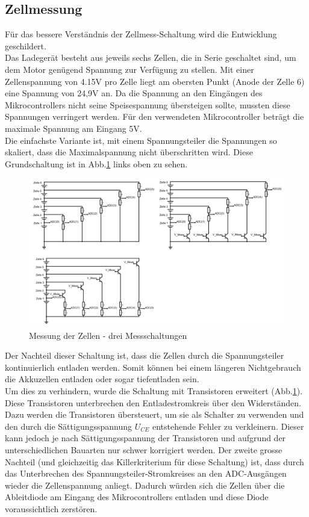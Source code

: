 \subsection*{Zellmessung}
Für das bessere Verständnis der Zellmess-Schaltung wird die Entwicklung geschildert. \\
Das Ladegerät besteht aus jeweils sechs Zellen, die in Serie geschaltet sind, um dem Motor genügend Spannung zur Verfügung zu stellen. Mit einer Zellenspannung von 4.15V pro Zelle liegt am obersten Punkt (Anode der Zelle 6) eine Spannung von 24,9V an. Da die Spannung an den Eingängen des Mikrocontrollers nicht seine Speisespannung übersteigen sollte, mussten diese Spannungen verringert werden. Für den verwendeten Mikrocontroller beträgt die maximale Spannung am Eingang 5V.
\\
Die einfachste Variante ist, mit einem Spannungsteiler die Spannungen so skaliert, dass die Maximalspannung nicht überschritten wird. Diese Grundschaltung ist in Abb.\ref{fig:zellmessung} links oben zu sehen. 
\begin{figure} [H]
	\centering
	\includegraphics[width=1\linewidth]{images/Zellmessung}
	\caption{Messung der Zellen - drei Messschaltungen}
	\label{fig:zellmessung}
\end{figure}
Der Nachteil dieser Schaltung ist, dass die Zellen durch die Spannungsteiler kontinuierlich entladen werden. Somit können bei einem längeren Nichtgebrauch die Akkuzellen entladen oder sogar tiefentladen sein. \\
Um dies zu verhindern, wurde die Schaltung mit Transistoren erweitert (Abb.\ref{fig:zellmessung}). Diese Transistoren unterbrechen den Entladestromkreis über den Widerständen. Dazu werden die Transistoren übersteuert, um sie als Schalter zu verwenden und den durch die Sättigungsspannung $U_{CE}$ entstehende Fehler zu verkleinern. Dieser kann jedoch je nach Sättigungsspannung der Transistoren und aufgrund der unterschiedlichen Bauarten nur schwer korrigiert werden. Der zweite grosse Nachteil (und gleichzeitig das Killerkriterium für diese Schaltung) ist, dass durch das Unterbrechen des Spannungsteiler-Stromkreises an den ADC-Ausgängen wieder die Zellenspannung anliegt. Dadurch würden sich die Zellen über die Ableitdiode am Eingang des Mikrocontrollers entladen und diese Diode voraussichtlich zerstören. \\
